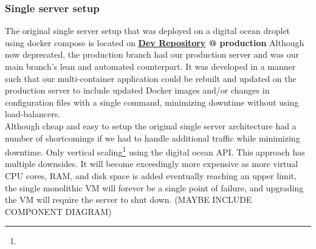 \subsubsection{Single server setup}
\label{subsubsec:scalingProd}
The original single server setup that was deployed on a digital ocean droplet using docker compose is located on \textbf{\hyperref[app:devRepo]{Dev Repository} @ production}
Although now deprecated, the production branch had our production server and was our main branch's lean and automated counterpart. It was developed in a manner such that our multi-container application could be rebuilt and updated on the production server to include updated Docker images and/or changes in configuration files with a single command, minimizing downtime without using load-balancers.\\
Although cheap and easy to setup the original single server architecture had a number of shortcomings if we had to handle additional traffic while minimizing downtime.
Only vertical scaling\footnote{} using the digital ocean API. This approach has multiple downsides. It will become exceedingly more expensive as more virtual CPU cores, RAM, and disk space is added eventually reaching an upper limit, the single monolithic VM will forever be a single point of failure, and upgrading the VM will require the server to shut down.
(MAYBE INCLUDE COMPONENT DIAGRAM)

